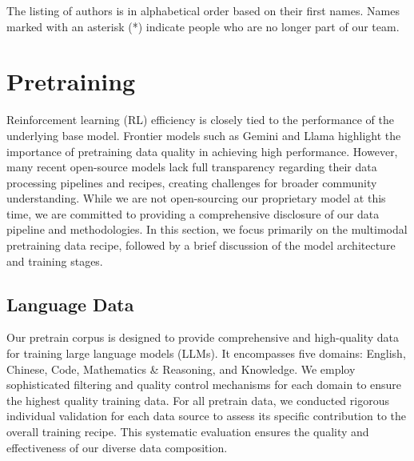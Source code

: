 \documentclass{article}
\newcommand{\citep}[1]{\parencite{#1}}
\begin{document}
The listing of authors is in alphabetical order based on their first names. Names marked with an asterisk (*) indicate people who are no longer part of our team.

\section{Pretraining}
\label{appendix:pretrain}

Reinforcement learning (RL) efficiency is closely tied to the performance of the underlying base model.
Frontier models such as Gemini\citep{geminiteam2024geminifamilyhighlycapable} and Llama\citep{grattafiori2024llama3herdmodels} highlight the importance of pretraining data quality in achieving high performance. 
However, many recent open-source models lack full transparency regarding their data processing pipelines and recipes, creating challenges for broader community understanding. While we are not open-sourcing our proprietary model at this time, we are committed to providing a comprehensive disclosure of our data pipeline and methodologies. In this section, we focus primarily on the multimodal pretraining data recipe, followed by a brief discussion of the model architecture and training stages.

\subsection{Language Data}

Our pretrain corpus is designed to provide comprehensive and high-quality data for training large language models (LLMs). It encompasses five domains: English, Chinese, Code, Mathematics \& Reasoning, and Knowledge. 
We employ sophisticated filtering and quality control mechanisms for each domain to ensure the highest quality training data. For all pretrain data, we conducted rigorous individual validation for each data source to assess its specific contribution to the overall training recipe. This systematic evaluation ensures the quality and effectiveness of our diverse data composition.
\end{document}
